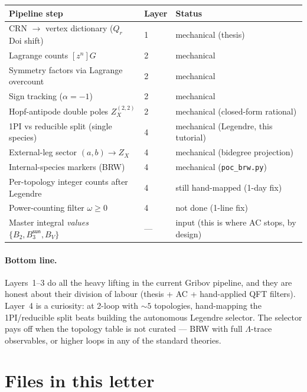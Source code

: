 \documentclass[11pt,a4paper]{article}
\begin{document}
\begin{center}
\begin{tabular}{@{}lll@{}}
\toprule
Pipeline step & Layer & Status \\
\midrule
CRN $\to$ vertex dictionary ($Q_r$ Doi shift)            & 1 & mechanical (thesis) \\
Lagrange counts $[z^n]G$                                  & 2 & mechanical \\
Symmetry factors via Lagrange overcount                   & 2 & mechanical \\
Sign tracking ($\alpha = -1$)                             & 2 & mechanical \\
Hopf-antipode double poles $Z^{(2,2)}_X$                  & 2 & mechanical (closed-form rational) \\
1PI vs reducible split (single species)                   & 4 & mechanical (Legendre, this tutorial) \\
External-leg sector $(a,b)\to Z_X$                        & 4 & mechanical (bidegree projection) \\
Internal-species markers (BRW)                            & 4 & mechanical (\texttt{poc\_brw.py}) \\
Per-topology integer counts after Legendre               & 4 & still hand-mapped (1-day fix) \\
Power-counting filter $\omega \ge 0$                      & 4 & not done (1-line fix) \\
Master integral \emph{values} $\{B_2, B_3^{\textsf{sun}}, B_V\}$ & --- & input (this is where AC stops, by design) \\
\bottomrule
\end{tabular}
\end{center}

\paragraph{Bottom line.} Layers~1--3 do all the heavy lifting in the
current Gribov pipeline, and they are honest about their division of labour
(thesis + AC + hand-applied QFT filters). Layer~4 is a curiosity: at
2-loop with $\sim 5$ topologies, hand-mapping the 1PI/reducible split
beats building the autonomous Legendre selector. The selector pays off when
the topology table is not curated --- BRW with full $\Lambda$-trace observables,
or higher loops in any of the standard theories.

\section*{Files in this letter}
\end{document}
